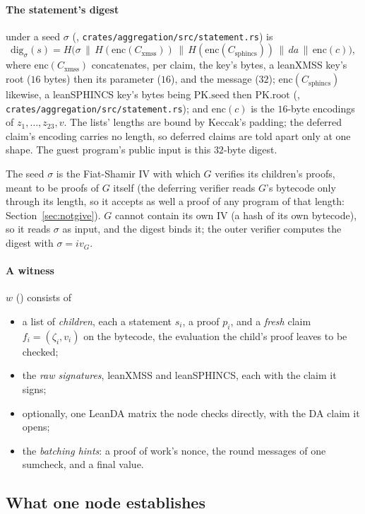 \documentclass[11pt]{article}
\newcommand{\Cx}{C_{\mathrm{xmss}}}
\newcommand{\Cs}{C_{\mathrm{sphincs}}}
\newcommand{\enc}{\mathrm{enc}}
\begin{document}
\paragraph{The statement's digest} under a seed $\sigma$ (,
\texttt{crates/aggregation/src/statement.rs}) is
\[
\mathrm{dig}_\sigma(s) = H\big(\sigma \,\|\, H(\enc(\Cx)) \,\|\, H(\enc(\Cs)) \,\|\, \mathit{da} \,\|\, \enc(c)\big),
\]
where $\enc(\Cx)$ concatenates, per claim, the key's bytes, a leanXMSS key's root ($16$ bytes)
then its parameter ($16$), and the message ($32$); $\enc(\Cs)$ likewise, a leanSPHINCS key's bytes
being $\mathrm{PK.seed}$ then $\mathrm{PK.root}$ (,
\texttt{crates/aggregation/src/statement.rs}); and $\enc(c)$ is the $16$-byte encodings of
$z_1, \dots, z_{23}, v$. The lists' lengths are bound by Keccak's padding;
the deferred claim's encoding carries no length, so deferred claims are told apart only at one
shape. The guest program's public input is this $32$-byte digest.

The seed $\sigma$ is the Fiat-Shamir IV with which $G$ verifies its children's proofs, meant to be
proofs of $G$ itself (the deferring verifier reads $G$'s bytecode only through its length, so it
accepts as well a proof of any program of that length: Section~\ref{sec:notgive}). $G$ cannot contain its own IV (a hash of its own bytecode), so it reads
$\sigma$ as input, and the digest binds it; the outer verifier computes the digest with
$\sigma = iv_G$.

\paragraph{A witness} $w$ () consists of
\begin{itemize}
\item a list of \emph{children}, each a statement $s_i$, a proof $p_i$, and a \emph{fresh} claim
$f_i = (\zeta_i, v_i)$ on the bytecode, the evaluation the child's proof leaves to be checked;
\item the \emph{raw signatures}, leanXMSS and leanSPHINCS, each with the claim it signs;
\item optionally, one LeanDA matrix the node checks directly, with the DA claim it opens;
\item the \emph{batching hints}: a proof of work's nonce, the round messages of one sumcheck, and a final value.
\end{itemize}

\subsection{What one node establishes}
\end{document}
